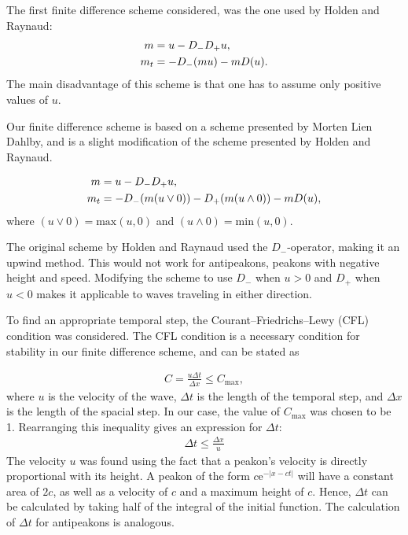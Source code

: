 The first finite difference scheme considered, was the one used by Holden and Raynaud: \cite{holden2006convergence}
\begin{align}
m &= u - D_{-}D_{+}u, \notag \\ 
m_t &= -D_{-}(mu) - mD(u).
\end{align}
The main disadvantage of this scheme is that one has to assume only positive values of $u$.

Our finite difference scheme is based on a scheme presented by Morten Lien Dahlby\cite{dahlby2007geometric}, and is a slight modification of the scheme presented by Holden and Raynaud.

\begin{align}
m &= u - D_{-}D_{+}u, \notag \\
m_t &= -D_{-}(m(u \vee 0)) -D_{+}(m(u \wedge 0)) - mD(u),
\end{align}
where $(u \vee 0) = \text{max}(u,0)$ and $(u \wedge 0) = \text{min}(u,0)$.

The original scheme by Holden and Raynaud used the $D_{-}$-operator, making it an upwind method. This would not work for antipeakons, peakons with negative height and speed. Modifying the scheme to use  $D_{-}$ when $u > 0$ and $D_{+}$ when $ u < 0$ makes it applicable to waves traveling in either direction. 

To find an appropriate temporal step, the Courant–Friedrichs–Lewy (CFL) condition was considered. The CFL condition is a necessary condition for stability in our finite difference scheme, and can be stated as

\begin{align}
C = \frac{u\Delta t}{\Delta x} \leq C_{\text{max}},
\end{align}
where $u$ is the velocity of the wave, $\Delta t$ is the length of the temporal step, and $\Delta x$ is the length of the spacial step. In our case, the value of $C_{\text{max}}$ was chosen to be 1. Rearranging this inequality gives an expression for $\Delta t$:
\begin{align}
\Delta t \leq \frac{\Delta x}{u}
\end{align}
The velocity $u$ was found using the fact that a peakon's velocity is directly proportional with its height. A peakon of the form $c\text{e}^{-|x-ct|}$ will have a constant area of $2c$, as well as a velocity of $c$ and a maximum height of $c$. Hence, $\Delta t$ can be calculated by taking half of the integral of the initial function. The calculation of $\Delta t$ for antipeakons is analogous. 


